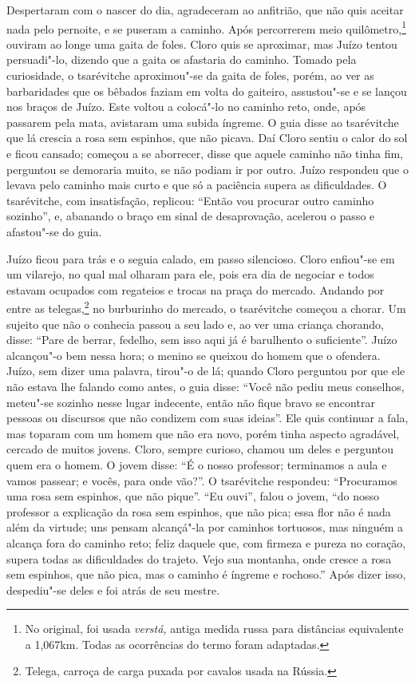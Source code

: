 Despertaram com o nascer do dia, agradeceram ao anfitrião, que não quis
aceitar nada pelo pernoite, e se puseram a caminho. Após percorrerem
meio quilômetro,\footnote{No original, foi usada \emph{verstá,} antiga
  medida russa para distâncias equivalente a 1,067km. Todas as
  ocorrências do termo foram adaptadas.} ouviram ao longe uma gaita de
foles. Cloro quis se aproximar, mas Juízo tentou persuadi"-lo, dizendo
que a gaita os afastaria do caminho. Tomado pela curiosidade, o
tsarévitche aproximou"-se da gaita de foles, porém, ao ver as
barbaridades que os bêbados faziam em volta do gaiteiro, assustou"-se e
se lançou nos braços de Juízo. Este voltou a colocá"-lo no caminho reto,
onde, após passarem pela mata, avistaram uma subida íngreme. O guia disse
ao tsarévitche que lá crescia a rosa sem espinhos, que não picava. Daí
Cloro sentiu o calor do sol e ficou cansado; começou a se aborrecer,
disse que aquele caminho não tinha fim, perguntou se demoraria muito, se
não podiam ir por outro. Juízo respondeu que o levava pelo caminho mais
curto e que só a paciência supera as dificuldades. O tsarévitche, com
insatisfação, replicou: ``Então vou procurar outro caminho sozinho'', e,
abanando o braço em sinal de desaprovação, acelerou o passo e afastou"-se
do guia.

Juízo ficou para trás e o seguia calado, em passo silencioso. Cloro
enfiou"-se em um vilarejo, no qual mal olharam para ele, pois era dia de
negociar e todos estavam ocupados com regateios e trocas na praça do
mercado. Andando por entre as telegas,\footnote{Telega, carroça de carga puxada por cavalos usada na Rússia.} no burburinho do mercado, o
tsarévitche começou a chorar. Um sujeito que não o conhecia passou a seu
lado e, ao ver uma criança chorando, disse: ``Pare de berrar, fedelho,
sem isso aqui já é barulhento o suficiente''. Juízo alcançou"-o bem nessa
hora; o menino se queixou do homem que o ofendera. Juízo, sem dizer uma
palavra, tirou"-o de lá; quando Cloro perguntou por que ele não estava
lhe falando como antes, o guia disse: ``Você não pediu meus conselhos,
meteu"-se sozinho nesse lugar indecente, então não fique bravo se
encontrar pessoas ou discursos que não condizem com suas ideias''. Ele
quis continuar a fala, mas toparam com um homem que não era novo, porém
tinha aspecto agradável, cercado de muitos jovens. Cloro, sempre
curioso, chamou um deles e perguntou quem era o homem. O jovem disse:
``É o nosso professor; terminamos a aula e vamos passear; e vocês, para
onde vão?''. O tsarévitche respondeu: ``Procuramos uma rosa sem
espinhos, que não pique''. ``Eu ouvi'', falou o jovem, ``do nosso
professor a explicação da rosa sem espinhos, que não pica; essa flor não
é nada além da virtude; uns pensam alcançá"-la por caminhos tortuosos,
mas ninguém a alcança fora do caminho reto; feliz daquele que, com
firmeza e pureza no coração, supera todas as dificuldades do trajeto.
Vejo sua montanha, onde cresce a rosa sem espinhos, que não pica, mas o
caminho é íngreme e rochoso.'' Após dizer isso, despediu"-se deles e foi
atrás de seu mestre.

